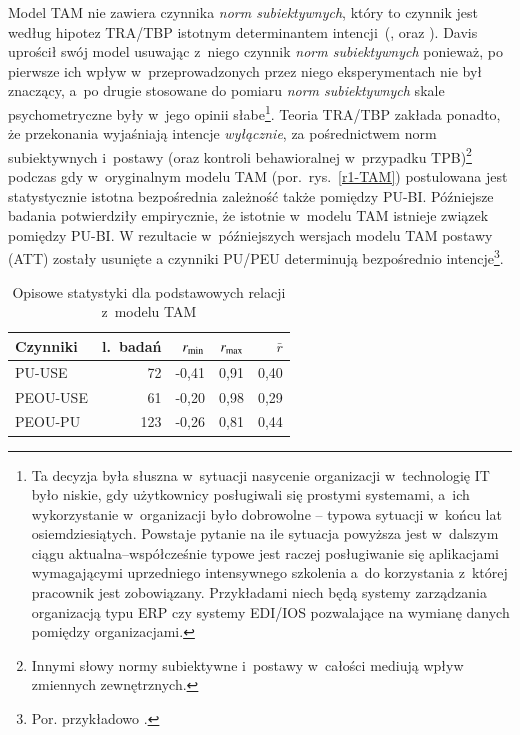 \documentclass[brudnopis,xodstep]{wkmgr}
\begin{document}
Model TAM nie zawiera czynnika
\emph{norm subiektywnych}, który to czynnik jest według hipotez
TRA/TBP istotnym determinantem intencji~(\citet{FishbeinAjzen1975},
\citet[s.~150]{TaylorTodd95} oraz \citet[s.~59--60]{Burton-JonesHubona05}).
Davis \citeyearpar[s.~986]{DavisetAl1989} uprościł swój model usuwając z~niego czynnik \emph{norm
  subiektywnych\/} ponieważ, po pierwsze ich wpływ
w~przeprowadzonych przez niego eksperymentach nie był znaczący, 
a~po drugie
stosowane do pomiaru \emph{norm subiektywnych\/} skale psychometryczne
były w~jego opinii słabe\footnote{Ta decyzja była
  słuszna w~sytuacji nasycenie organizacji w~technologię IT było
  niskie, gdy użytkownicy posługiwali się prostymi systemami, a~ich
  wykorzystanie w~organizacji było dobrowolne -- typowa sytuacji
  w~końcu lat osiemdziesiątych. 
Powstaje pytanie na ile sytuacja powyższa jest w~dalszym ciągu aktualna--współcześnie
typowe jest raczej posługiwanie się aplikacjami wymagającymi uprzedniego
intensywnego szkolenia a~do korzystania z~której pracownik jest zobowiązany. 
Przykładami niech będą systemy zarządzania organizacją typu ERP czy systemy 
EDI/IOS pozwalające
na wymianę danych pomiędzy organizacjami.}. 
Teoria TRA/TBP zakłada ponadto, że przekonania wyjaśniają 
intencje \emph{wyłącznie\/}, za pośrednictwem norm subiektywnych i~postawy 
(oraz kontroli behawioralnej w~przypadku TPB)\footnote{Innymi słowy 
 normy subiektywne i~postawy w~całości mediują wpływ zmiennych zewnętrznych.} podczas gdy w~oryginalnym
modelu TAM (por.~rys.~\ref{r1-TAM}) 
postulowana jest  statystycznie istotna bezpośrednia zależność także pomiędzy PU-BI.
Późniejsze badania potwierdziły empirycznie, że istotnie w~modelu TAM istnieje związek pomiędzy
PU-BI. W rezultacie w~późniejszych wersjach modelu TAM postawy (ATT)
zostały usunięte a czynniki
PU/PEU determinują bezpośrednio intencje\footnote{Por. 
przykładowo \cite{IgbariaetAl97,Burton-JonesHubona05,VenkateshDavis00}.}.

\begin{table}[!tbh]\small
\caption{Opisowe statystyki dla podstawowych relacji z~modelu TAM}
\label{tab:ES-TAM}
\begin{tabular*}{\textwidth}{@{\extracolsep{\stretch{1}}}lrrrr} \hline
Czynniki   & l.~badań  & $r_{\rm min}$ & $r_{\rm max}$ & $\bar r$ \\ \hline
PU-USE     &  72 & -0,41 &  0,91  & 0,40 \\
PEOU-USE   &  61 & -0,20 &  0,98  & 0,29 \\ 
PEOU-PU    & 123 & -0,26 &  0,81  & 0,44 \\ \hline
\end{tabular*}
\end{table}
\end{document}
